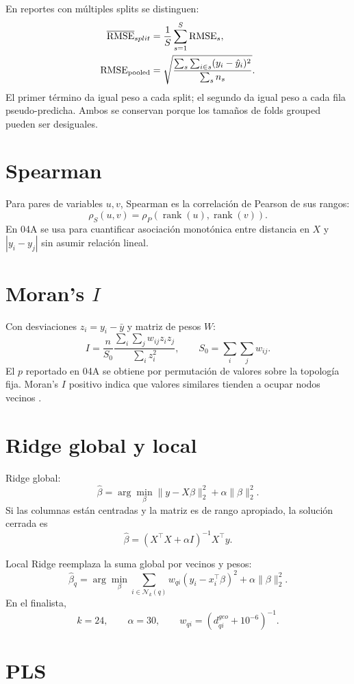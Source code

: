 En reportes con múltiples splits se distinguen:
\begin{align}
\overline{\operatorname{RMSE}}_{split}
&=
\frac{1}{S}\sum_{s=1}^S\operatorname{RMSE}_s,\\
\operatorname{RMSE}_{\mathrm{pooled}}
&=
\sqrt{
\frac{\sum_s\sum_{i\in s}(y_i-\hat y_i)^2}
{\sum_s n_s}
}.
\end{align}
El primer término da igual peso a cada split; el segundo da igual peso a cada fila
pseudo-predicha. Ambos se conservan porque los tamaños de folds grouped pueden ser
desiguales.

\section{Spearman}

Para pares de variables $u,v$, Spearman es la correlación de Pearson de sus rangos:
\[
\rho_S(u,v)
=
\rho_P(\operatorname{rank}(u),\operatorname{rank}(v)).
\]
En 04A se usa para cuantificar asociación monotónica entre distancia en $X$ y
$|y_i-y_j|$ sin asumir relación lineal.

\section{Moran's \texorpdfstring{$I$}{I}}

Con desviaciones $z_i=y_i-\bar y$ y matriz de pesos $W$:
\[
I
=
\frac{n}{S_0}
\frac{\sum_i\sum_jw_{ij}z_i z_j}
{\sum_i z_i^2},
\qquad
S_0=\sum_i\sum_jw_{ij}.
\]
El $p$ reportado en 04A se obtiene por permutación de valores sobre la topología fija. Moran's
$I$ positivo indica que valores similares tienden a ocupar nodos vecinos
\citep{Moran1950}.

\section{Ridge global y local}

Ridge global:
\[
\widehat\beta
=
\arg\min_\beta
\|y-X\beta\|_2^2+\alpha\|\beta\|_2^2.
\]
Si las columnas están centradas y la matriz es de rango apropiado, la solución cerrada es
\[
\widehat\beta
=
(X^\top X+\alpha I)^{-1}X^\top y.
\]

Local Ridge reemplaza la suma global por vecinos y pesos:
\[
\widehat\beta_q
=
\arg\min_\beta
\sum_{i\in\mathcal N_k(q)}
w_{qi}(y_i-x_i^\top\beta)^2
+\alpha\|\beta\|_2^2.
\]
En el finalista,
\[
k=24,\qquad
\alpha=30,\qquad
w_{qi}=(d^{geo}_{qi}+10^{-6})^{-1}.
\]

\section{PLS}

